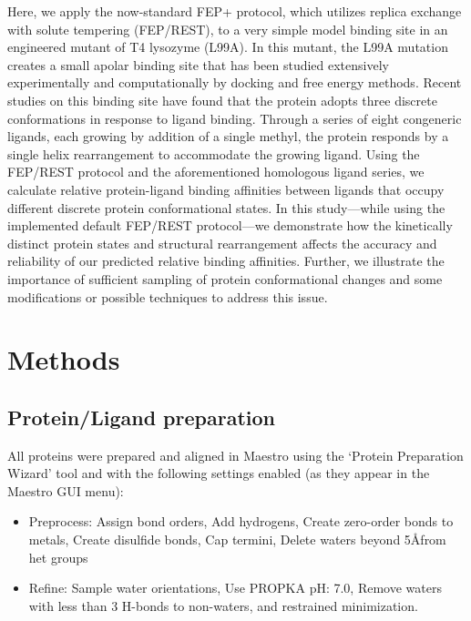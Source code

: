 \documentclass[journal=jctcce,manuscript=article]{achemso}
\begin{document}
Here, we apply the now-standard FEP+ protocol, which utilizes replica exchange with solute tempering (FEP/REST)\cite{FEP/REST}, to a very simple model binding site in an engineered mutant of T4 lysozyme (L99A).
In this mutant, the L99A mutation creates a small apolar binding site that has been studied extensively experimentally\cite{eriksson1992response,eriksson1993similar,T4affinity,doi:10.1021/bi00027a007} and computationally by docking\cite{wei2002model,wei2004testing,graves2005decoys,Merski2015} and free energy methods\cite{Mobley20071118,hermans1997inclusion,boresch2003absolute,deng2006calculation,mann2000modeling,Boyce2009,FEP/REST,FEP/RESTapp}.
Recent studies on this binding site have found that the protein adopts three discrete conformations in response to ligand binding.
Through a series of eight congeneric ligands, each growing by addition of a single methyl, the protein responds by a single helix rearrangement to accommodate the growing ligand\cite{Merski2015}.
Using the FEP/REST protocol and the aforementioned homologous ligand series, we calculate relative protein-ligand binding affinities between ligands that occupy different discrete protein conformational states.
In this study---while using the implemented default FEP/REST protocol---we demonstrate how the kinetically distinct protein states and structural rearrangement affects the accuracy and reliability of our predicted relative binding affinities.
Further, we illustrate the importance of sufficient sampling of protein conformational changes and some modifications or possible techniques to address this issue.

\section{Methods}
\subsection*{Protein/Ligand preparation}
All proteins were prepared and aligned in Maestro\cite{Maestro} using the `Protein Preparation Wizard'\cite{ProteinPrepWizSoftware,Epik,Impact,Prime,ProteinPrepWizPaper} tool and with the following settings enabled (as they appear in the Maestro GUI menu):
   \begin{itemize}
   \item Preprocess: Assign bond orders, Add hydrogens, Create zero-order bonds to metals, Create disulfide bonds, Cap termini, Delete waters beyond 5\AA  from het groups
   \item Refine: Sample water orientations, Use PROPKA pH: 7.0, Remove waters with less than 3 H-bonds to non-waters, and restrained minimization.
   \end{itemize}
\end{document}
